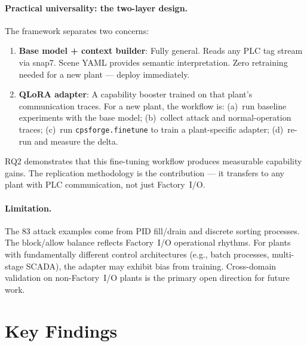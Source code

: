 \documentclass[11pt]{article}
\begin{document}
\paragraph{Practical universality: the two-layer design.}
The framework separates two concerns:
\begin{enumerate}[leftmargin=1.5em,nosep]
    \item \textbf{Base model + context builder}: Fully general. Reads any PLC tag stream via snap7. Scene YAML provides semantic interpretation. Zero retraining needed for a new plant --- deploy immediately.
    \item \textbf{QLoRA adapter}: A capability booster trained on that plant's communication traces. For a new plant, the workflow is: (a)~run baseline experiments with the base model; (b)~collect attack and normal-operation traces; (c)~run \texttt{cpsforge.finetune} to train a plant-specific adapter; (d)~re-run and measure the delta.
\end{enumerate}
RQ2 demonstrates that this fine-tuning workflow produces measurable capability gains. The replication methodology is the contribution --- it transfers to any plant with PLC communication, not just Factory~I/O.

\paragraph{Limitation.}
The 83 attack examples come from PID fill/drain and discrete sorting processes. The block/allow balance reflects Factory~I/O operational rhythms. For plants with fundamentally different control architectures (e.g., batch processes, multi-stage SCADA), the adapter may exhibit bias from training. Cross-domain validation on non-Factory~I/O plants is the primary open direction for future work.


\section*{Key Findings}
\end{document}
